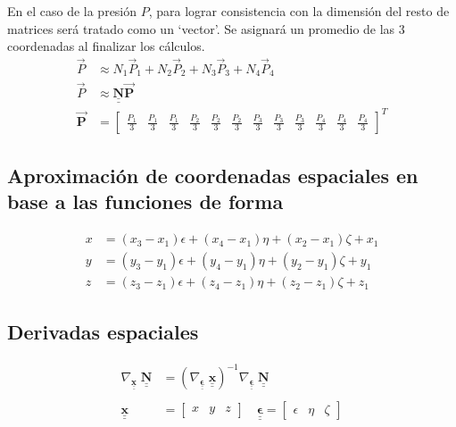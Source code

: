 \documentclass[12pt]{article}
\def\doubleunderline#1{\underline{\underline{#1}}}
\def\mt#1{\underline{\underline{\mathbf{#1}}}}
\newcommand{\vP}{\vec{P}}
\newcommand{\Pb}{\vec{\mathbf{P}}}
\newcommand{\nb}{\doubleunderline{\mathbf{N}}}
\begin{document}
En el caso de la presi\'on $P$, para lograr consistencia con la dimensi\'on del resto de matrices
ser\'a tratado como un `vector'. Se asignar\'a un promedio de las 3 coordenadas al finalizar los c\'alculos.
\begin{align*}
	\vP &\approx  N_1 \vP_1 + N_2 \vP_2 + N_3 \vP_3 + N_4 \vP_4 \\
	\vP &\approx \nb \Pb \\
	\Pb &= \begin{bmatrix} \frac{P_1}{3} & \frac{P_1}{3} & \frac{P_1}{3} & \frac{P_2}{3} & \frac{P_2}{3} & \frac{P_2}{3} & \frac{P_3}{3} & \frac{P_3}{3} & \frac{P_3}{3} & \frac{P_4}{3} & \frac{P_4}{3} & \frac{P_4}{3} \end{bmatrix}^{T}
\end{align*}

\subsection{Aproximaci\'on de coordenadas espaciales en base a las funciones de forma}
\begin{align*}
	x &= (x_3 - x_1) \epsilon + (x_4 - x_1) \eta  + (x_2 - x_1) \zeta + x_1	 \\
	y &= (y_3 - y_1) \epsilon + (y_4 - y_1) \eta  + (y_2 - y_1) \zeta + y_1	 \\
	z &= (z_3 - z_1) \epsilon + (z_4 - z_1) \eta  + (z_2 - z_1) \zeta + z_1
\end{align*}

\subsection{Derivadas espaciales}
\begin{align*}
	\nabla_{\mt{x}} \; \nb &= \left(\nabla_{\mt{\epsilon}} \; \mt{x} \right)^{-1} \nabla_{\mt{\epsilon}} \; \nb \\ \\
	\mt{x} &= \begin{bmatrix} x & y & z \end{bmatrix} \quad \mt{\epsilon} = \begin{bmatrix} \epsilon & \eta & \zeta \end{bmatrix}
\end{align*}
\end{document}
